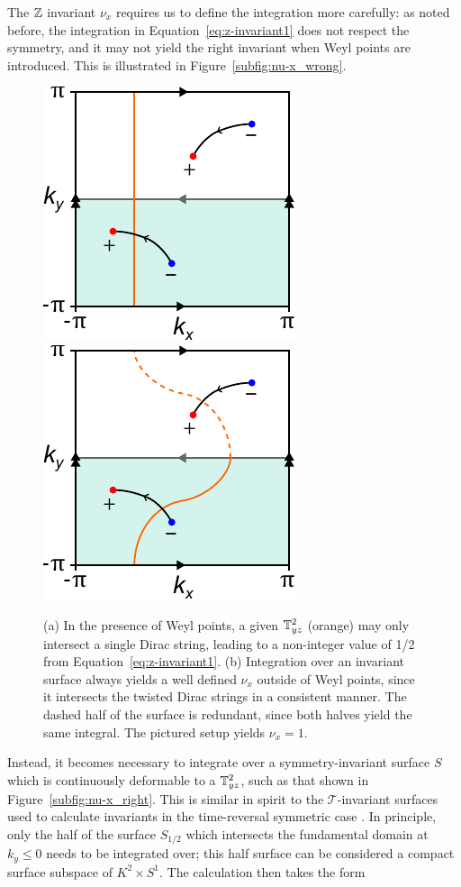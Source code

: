 The $\mathbb{Z}$ invariant $\nu_x$ requires us to define the integration more carefully: as noted before, the integration in Equation~\eqref{eq:z-invariant1} does not respect the symmetry, and it may not yield the right invariant when Weyl points are introduced. This is illustrated in Figure~\ref{subfig:nu-x_wrong}.
\begin{figure}[htb!]
	\centering
	\subcaptionbox{\label{subfig:nu-x_wrong}} {\includegraphics[width=.3\textwidth]{Images/nu-x_wrong}}
	\hfil
	\subcaptionbox{\label{subfig:nu-x_right}} {\includegraphics[width=.3\textwidth]{Images/nu-x_right}}
	\caption{(a) In the presence of Weyl points, a given $\mathbb{T}_{yz}^2$ (orange) may only intersect a single Dirac string, leading to a non-integer value of 1/2 from Equation~\eqref{eq:z-invariant1}. (b) Integration over an invariant surface always yields a well defined $\nu_x$ outside of Weyl points, since it intersects the twisted Dirac strings in a consistent manner. The dashed half of the surface is redundant, since both halves yield the same integral. The pictured setup yields $\nu_x=1$.}
	\label{fig:nu-x}
\end{figure}
Instead, it becomes necessary to integrate over a symmetry-invariant surface $S$ which is continuously deformable to a $\mathbb{T}_{yz}^2$, such as that shown in Figure~\ref{subfig:nu-x_right}. This is similar in spirit to the $\mathcal{T}$-invariant surfaces used to calculate invariants in the time-reversal symmetric case \cite{Thiang_equivariant}. In principle, only the half of the surface $S_{1/2}$ which intersects the fundamental domain at $k_y\leq 0$ needs to be integrated over; this half surface can be considered a compact surface subspace of $K^2\times S^1$. The calculation then takes the form
